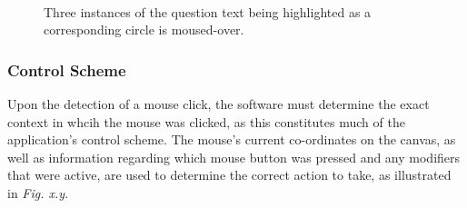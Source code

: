 \documentclass[12pt,twoside,notitlepage,xetex]{report}
\begin{document}
\begin{center}
\begin{figure}[H]
\begin{center}
\\
\vspace{0.5cm}
\end{center}
\caption{Three instances of the question text being highlighted as a corresponding circle is moused-over.}
\end{figure}
\end{center}

\subsubsection{Control Scheme}

Upon the detection of a mouse click, the software must determine the exact context in whcih the mouse was clicked, as this constitutes much of the application's control scheme.  The mouse's current co-ordinates on the canvas, as well as information regarding which mouse button was pressed and any modifiers that were active, are used to determine the correct action to take, as illustrated in \emph{Fig. x.y}.
\end{document}

